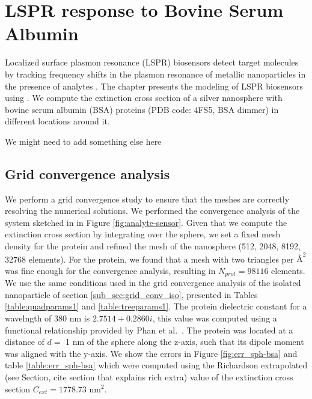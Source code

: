 
\chapter{LSPR response to Bovine Serum Albumin} \label{chap:lspr_response_bsa}
\graphicspath{{lspr_response_bsa/figs/}}

Localized surface plasmon resonance (LSPR) biosensors detect target molecules
by tracking frequency shifts in the plasmon resonance of metallic nanoparticles
in the presence of analytes \cite{WilletsVandyune2007}. The chapter presents the 
modeling of LSPR biosensors using \pygbe. We compute the extinction cross section 
of a silver nanosphere with bovine serum albumin (BSA) proteins (PDB code: 4FS5,
BSA dimmer) in different locations around it. 


{\color{red}
We might need to add something else here
}

\section{Grid convergence analysis} \label{sec:grid_conv_bsa}
We perform a grid convergence study to ensure that the meshes are correctly
resolving the numerical solutions. We performed the convergence analysis of
the system sketched in in Figure \ref{fig:analyte-sensor}. Given that we 
compute the extinction cross section by integrating over the sphere, we set 
a fixed mesh density for the protein and refined the mesh of the nanosphere 
(512, 2048, 8192, 32768 elements). For the protein, we found that a mesh with
two triangles per $\text{\AA}^2$ was fine enough for the convergence 
analysis, resulting in $N_{prot} = 98116$ elements.
We use the same conditions used in the grid convergence analysis of the 
isolated nanoparticle of section \ref{sub_sec:grid_conv_iso}, presented
in Tables \ref{table:quadparams1} and \ref{table:treeparams1}. The protein 
dielectric constant for a wavelngth of 380 nm is $2.7514 + 0.2860i$, this  
value was computed using a functional relationship provided by Phan
 et al.~\cite{PhanETal2013}. The protein was located at a distance of 
 $d=$ 1 nm of the sphere along the z-axis, such that its dipole moment 
 was aligned with the y-axis. We show the errors in Figure  \ref{fig:err_sph-bsa} 
 and table \ref{table:err_sph-bsa} which were computed using the Richardson extrapolated
{\color{red} (see Section, cite section that explains rich extra)} value of 
the extinction cross section $C_{ext}= 1778.73$ nm$^2$.

